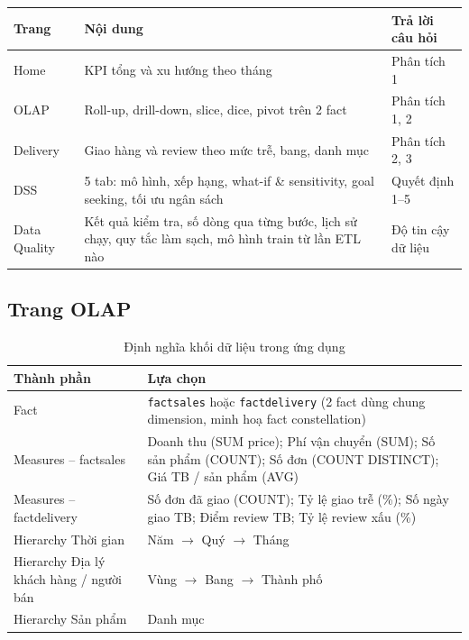 \documentclass[12pt,a4paper]{report}
\newcommand{\code}[1]{\texttt{#1}}
\renewcommand{\_}{\oldunderscore\allowbreak}
\begin{document}
\begin{table}[H]
\centering\small
\begin{tabular}{L{2.6cm}L{9cm}L{3cm}}
\toprule
Trang & Nội dung & Trả lời câu hỏi \\
\midrule
Home & KPI tổng và xu hướng theo tháng & Phân tích 1 \\
OLAP & Roll-up, drill-down, slice, dice, pivot trên 2 fact & Phân tích 1, 2 \\
Delivery & Giao hàng và review theo mức trễ, bang, danh mục & Phân tích 2, 3 \\
DSS & 5 tab: mô hình, xếp hạng, what-if \& sensitivity, goal seeking, tối ưu ngân sách & Quyết định 1--5 \\
Data Quality & Kết quả kiểm tra, số dòng qua từng bước, lịch sử chạy, quy tắc làm sạch, mô hình train từ lần ETL nào & Độ tin cậy dữ liệu \\
\bottomrule
\end{tabular}
\end{table}

\subsection{Trang OLAP}\label{sec:olap-page}

\begin{table}[H]
\centering\small
\caption{Định nghĩa khối dữ liệu trong ứng dụng}
\begin{tabular}{L{4cm}L{10.6cm}}
\toprule
Thành phần & Lựa chọn \\
\midrule
Fact & \code{fact\_sales} hoặc \code{fact\_delivery} (2 fact dùng chung dimension, minh hoạ fact constellation) \\
Measures -- fact\_sales & Doanh thu (SUM price); Phí vận chuyển (SUM); Số sản phẩm (COUNT); Số đơn (COUNT DISTINCT); Giá TB / sản phẩm (AVG) \\
Measures -- fact\_delivery & Số đơn đã giao (COUNT); Tỷ lệ giao trễ (\%); Số ngày giao TB; Điểm review TB; Tỷ lệ review xấu (\%) \\
Hierarchy Thời gian & Năm $\rightarrow$ Quý $\rightarrow$ Tháng \\
Hierarchy Địa lý khách hàng / người bán & Vùng $\rightarrow$ Bang $\rightarrow$ Thành phố \\
Hierarchy Sản phẩm & Danh mục \\
\bottomrule
\end{tabular}
\end{table}
\end{document}
